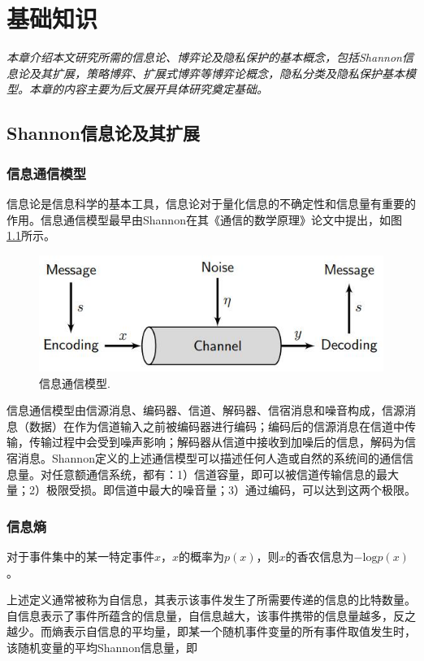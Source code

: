 \chapter{基础知识}
\label{chap:preliminary}

\textit{}

\textit{本章介绍本文研究所需的信息论、博弈论及隐私保护的基本概念，包括Shannon信息论及其扩展，策略博弈、扩展式博弈等博弈论概念，隐私分类及隐私保护基本模型。本章的内容主要为后文展开具体研究奠定基础。}
\section{Shannon信息论及其扩展}

\subsection{信息通信模型}
信息论\cite{shannon1948mathematical,
	stone2018information}是信息科学的基本工具，信息论对于量化信息的不确定性和信息量有重要的作用。信息通信模型最早由Shannon在其《通信的数学原理》论文中提出，如图\ref{fig:communication-model}所示。

\begin{figure}[htbp]
	\centering
	\includegraphics[width = 0.6\linewidth]{./figures/shannon-communicaiton-model.jpg}
	\caption{信息通信模型\cite{stone2018information}.
	}
	\label{fig:communication-model}
\end{figure}

信息通信模型\cite{stone2018information}由信源消息、编码器、信道、解码器、信宿消息和噪音构成，信源消息（数据）在作为信道输入之前被编码器进行编码；编码后的信源消息在信道中传输，传输过程中会受到噪声影响；解码器从信道中接收到加噪后的信息，解码为信宿消息。Shannon定义的上述通信模型可以描述任何人造或自然的系统间的通信信息量。对任意额通信系统，都有：1）信道容量，即可以被信道传输信息的最大量；2）极限受损。即信道中最大的噪音量；3）通过编码，可以达到这两个极限。



\subsection{信息熵}


\begin{definition}
	对于事件集中的某一特定事件$x$，$x$的概率为$p(x)$，则$x$的香农信息为$-\text{log}p(x)$。
\end{definition}
上述定义通常被称为自信息，其表示该事件发生了所需要传递的信息的比特数量。自信息表示了事件所蕴含的信息量，自信息越大，该事件携带的信息量越多，反之越少。而熵表示自信息的平均量，即某一个随机事件变量的所有事件取值发生时，该随机变量的平均Shannon信息量，即

